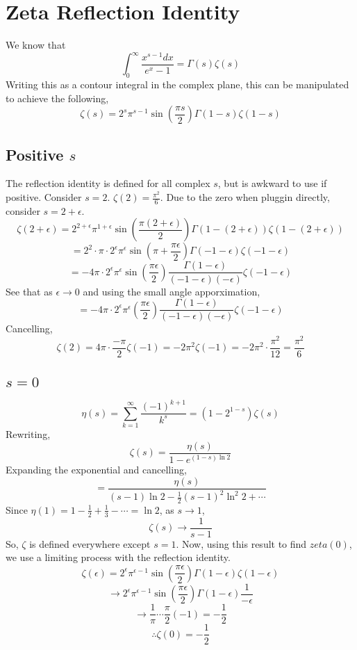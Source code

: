 \documentclass[../main.tex]{subfiles}
\begin{document}
\section{Zeta Reflection Identity}
We know that $$\int_{0}^{\infty}\frac{x^{s-1}dx}{e^{x}-1}=\Gamma(s)\zeta(s)$$
Writing this as a contour integral in the complex plane, this can be manipulated to achieve the following,
$$\zeta(s)=2^{s}\pi^{s-1}\sin(\frac{\pi s}{2})\Gamma(1-s)\zeta(1-s)$$

\subsection{Positive $s$}
The reflection identity is defined for all complex $s$, but is awkward to use if positive.
Consider $s=2$. $\zeta(2)=\frac{\pi^{2}}{6}$. Due to the zero when pluggin directly, consider $s=2+\epsilon$.
$$\zeta(2+\epsilon)=2^{2+\epsilon}\pi^{1+\epsilon}\sin(\frac{\pi(2+\epsilon)}{2})\Gamma(1-(2+\epsilon))\zeta(1-(2+\epsilon))$$
$$=2^{2}\cdot\pi\cdot 2^{\epsilon}\pi^{\epsilon}\sin(\pi+\frac{\pi\epsilon}{2})\Gamma(-1-\epsilon)\zeta(-1-\epsilon)$$
$$=-4\pi\cdot 2^{\epsilon}\pi^{\epsilon}\sin(\frac{\pi\epsilon}{2})\frac{\Gamma(1-\epsilon)}{(-1-\epsilon)(-\epsilon)}\zeta(-1-\epsilon)$$
See that as $\epsilon\rightarrow 0$ and using the small angle apporximation,
$$=-4\pi\cdot 2^{\epsilon}\pi^{\epsilon}(\frac{\pi\epsilon}{2})\frac{\Gamma(1-\epsilon)}{(-1-\epsilon)(-\epsilon)}\zeta(-1-\epsilon)$$
Cancelling,
$$\zeta(2)=4\pi\cdot\frac{-\pi}{2}\zeta(-1)=-2\pi^{2}\zeta(-1)=-2\pi^{2}\cdot\frac{\pi^{2}}{12}=\frac{\pi^{2}}{6}$$

\subsection{$s=0$}
$$\eta(s)=\sum_{k=1}^{\infty}\frac{(-1)^{k+1}}{k^{s}}=(1-2^{1-s})\zeta(s)$$
Rewriting,
$$\zeta(s)=\frac{\eta(s)}{1-e^{(1-s)\ln 2}}$$
Expanding the exponential and cancelling,
$$=\frac{\eta(s)}{(s-1)\ln 2 - \frac{1}{2}(s-1)^{2}\ln^{2} 2 + \cdots}$$
Since $\eta(1)=1-\frac{1}{2}+\frac{1}{3}-\cdots=\ln 2$, as $s\rightarrow 1$,
$$\zeta(s)\rightarrow\frac{1}{s-1}$$
So, $\zeta$ is defined everywhere except $s=1$. Now, using this result to find $zeta(0)$, we
use a limiting process with the reflection identity.
$$\zeta(\epsilon)=2^{\epsilon}\pi^{\epsilon-1}\sin(\frac{\pi\epsilon}{2})\Gamma(1-\epsilon)\zeta(1-\epsilon)$$
$$\rightarrow 2^{\epsilon}\pi^{\epsilon-1}\sin(\frac{\pi\epsilon}{2})\Gamma(1-\epsilon)\frac{1}{-\epsilon}$$
$$\rightarrow \frac{1}{\pi}\cdots\frac{\pi}{2}(-1)=-\frac{1}{2}$$
$$\therefore\zeta(0)=-\frac{1}{2}$$
\end{document}
